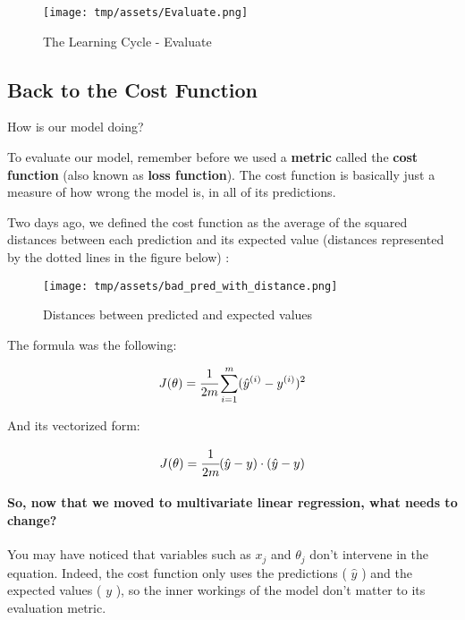 \documentclass[]{article}
\let\oldparagraph\paragraph
\renewcommand{\paragraph}[1]{\oldparagraph{#1}\mbox{}}
\begin{document}
\begin{figure}
\centering
\texttt{[image: tmp/assets/Evaluate.png]}
\caption{The Learning Cycle - Evaluate}
\end{figure}

\hypertarget{back-to-the-cost-function}{%
\subsection{Back to the Cost Function}\label{back-to-the-cost-function}}

How is our model doing?

To evaluate our model, remember before we used a \textbf{metric} called
the \textbf{cost function} (also known as \textbf{loss function}). The
cost function is basically just a measure of how wrong the model is, in
all of its predictions.

Two days ago, we defined the cost function as the average of the squared
distances between each prediction and its expected value (distances
represented by the dotted lines in the figure below) :

\begin{figure}
\centering
\texttt{[image: tmp/assets/bad\_pred\_with\_distance.png]}
\caption{Distances between predicted and expected values}
\end{figure}

The formula was the following:

\large

\[
J(\theta) = \cfrac{1}{2m}\sum_{i=1}^{m}(\hat{y}^{(i)} - y^{(i)})^2
\] \normalsize

And its vectorized form:

\large

\[
\begin{matrix}
J(\theta) = \cfrac{1}{2m}(\hat{y} - y)\cdot(\hat{y}- y)
\end{matrix}
\] \normalsize

\hypertarget{so-now-that-we-moved-to-multivariate-linear-regression-what-needs-to-change}{%
\paragraph{So, now that we moved to multivariate linear regression, what
needs to
change?}\label{so-now-that-we-moved-to-multivariate-linear-regression-what-needs-to-change}}

You may have noticed that variables such as \(x_j\) and \(\theta_j\)
don't intervene in the equation. Indeed, the cost function only uses the
predictions ( \(\hat{y}\) ) and the expected values ( \(y\) ), so the
inner workings of the model don't matter to its evaluation metric.
\end{document}
